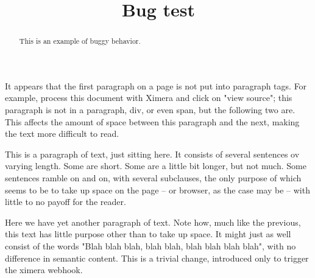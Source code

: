 \documentclass{ximera}
\title{Bug test}
\begin{document}
\begin{abstract}
This is an example of buggy behavior.
\end{abstract}
\maketitle

It appears that the first paragraph on a page is not put into paragraph tags. For example, process this document with Ximera and click on "view source"; this paragraph is not in a paragraph, div, or even span, but the following two are. This affects the amount of space between this paragraph and the next, making the text more difficult to read.

This is a paragraph of text, just sitting here. It consists of several sentences ov varying length. Some are short. Some are a little bit longer, but not much. Some sentences ramble on and on, with several subclauses, the only purpose of which seems to be to take up space on the page -- or browser, as the case may be -- with little to no payoff for the reader.

Here we have yet another paragraph of text. Note how, much like the previous, this text has little purpose other than to take up space. It might just as well consist of the words "Blah blah blah, blah blah, blah blah blah blah", with no difference in semantic content. This is a trivial change, introduced only to trigger the ximera webhook.
\end{document}
